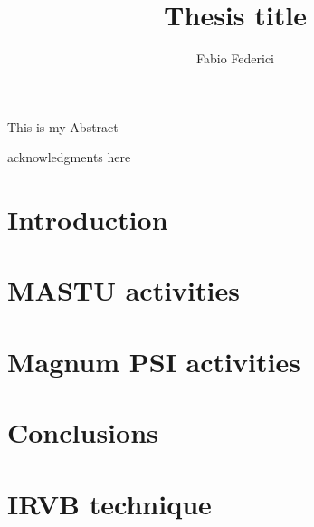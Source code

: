 \documentclass[]{yorkThesis}  %
\title{Thesis title}
\author{Fabio Federici}
\begin{document}
\titlePage
\abstract
{}
This is my Abstract

\contents

\acknowledgments
{}
acknowledgments here

\declaration



\pagestyle{headings}
\chapter{Introduction}\label{chapter1}





\chapter{MASTU activities}\label{chapter2}


\chapter{Magnum PSI activities}\label{chapter3}


\chapter{Conclusions}\label{chapter4}


\appendix
\chapter{IRVB technique}\label{appendix1}

\end{document}
